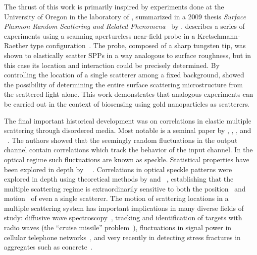 The thrust of this work is primarily inspired by experiments done at the
University of Oregon in the laboratory of , summarized in a 2009
thesis \textit{Surface Plasmon Random Scattering and Related
Phenomena}~\cite{schumann2009surface} by .  
describes a series of experiments using a scanning apertureless near-field
probe in a Kretschmann-Raether type configuration~\cite{kim1995scanning}.  The
probe, composed of a sharp tungsten tip, was shown to elastically scatter SPPs
in a way analogous to surface roughness, but in this case its location and
interaction could be precisely determined.  By controlling the location of
a single scatterer among a fixed background,  showed the
possibility of determining the entire surface scattering microstructure from
the scattered light alone.  This work demonstrates that analogous experiments
can be carried out in the context of biosensing using gold nanoparticles as
scatterers.

The final important historical development was on correlations in elastic
multiple scattering through disordered media.  Most notable is a seminal paper
by , , , and
~\cite{feng1988correlations}.  The authors showed that the
seemingly random fluctuations in the output channel contain correlations which
track the behavior of the input channel.  In the optical regime such
fluctuations are known as speckle.  Statistical properties have been explored
in depth by
~\cite{goodman2007speckle}~\cite{goodman1975statistical}.
Correlations in optical speckle patterns were explored in depth using
theoretical methods by  and
~\cite{berkovits1994correlations}, establishing that the multiple
scattering regime is extraordinarily sensitive to both the
position~\cite{berkovits1990theory} and motion~\cite{berkovits1991sensitivity}
of even a single scatterer.  The motion of scattering locations in a multiple
scattering system has important implications in many diverse fields of study:
diffusive wave spectroscopy~\cite{pine1988diffusing}, tracking and
identification of targets with radio waves (the ``cruise missile''
problem~\cite{atkins1991neural}), fluctuations in signal power in cellular
telephone networks~\cite{abdi2001estimation}, and very recently in detecting
stress fractures in aggregates such as concrete~\cite{larose2010locating}. 
